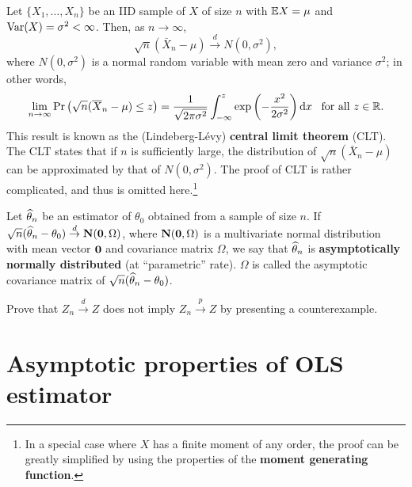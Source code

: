 \documentclass[11pt, A4paper, openany, uplatex]{book}
\begin{document}
Let $\{ X_1,\ldots,X_n \}$ be an IID sample of $X$ of size $n$ with $\mathbb{E} X = \mu$ and $\mathrm{Var}(X) = \sigma^2 < \infty$.
Then, as $n \to \infty$,
\[	
\sqrt{n}(\bar X_n - \mu) \overset{d}{\to} N(0,\sigma^2),
\]
where $N(0, \sigma^2)$ is a normal random variable with mean zero and variance $\sigma^2$; in other words,
\[
\lim_{n \to \infty}\Pr\left( \sqrt{n}(\overline X_n - \mu) \le z \right) = \frac{1}{\sqrt{2 \pi \sigma^2}}\int_{-\infty}^z \exp\left(-\frac{x^2}{2\sigma^2} \right) \mathrm{d}x \;\;\; \text{for all $z\in\mathbb{R}$.}
\]
This result is known as the (Lindeberg-L\'{e}vy) \textbf{central limit theorem} (CLT).
The CLT states that if $n$ is sufficiently large, the distribution of $\sqrt{n}(\bar X_n - \mu)$ can be approximated by that of $N(0,\sigma^2)$.
The proof of CLT is rather complicated, and thus is omitted here.\footnote{
	In a special case where $X$ has a finite moment of any order, the proof can be greatly simplified by using the properties of the \textbf{moment generating function}.
}
\bigskip

Let $\widehat \theta_n$ be an estimator of $\theta_0$ obtained from a sample of size $n$.
If $\sqrt{n}(\widehat \theta_n - \theta_0) \overset{d}{\to} \mathbf{N}(\mathbf{0},\Omega)$, where $\mathbf{N}(\mathbf{0}, \Omega)$ is a multivariate normal distribution with mean vector $\mathbf{0}$ and covariance matrix $\Omega$, we say that $\widehat \theta_n$ is \textbf{asymptotically normally distributed} (at ``parametric'' rate).
$\Omega$ is called the asymptotic covariance matrix of $\sqrt{n}(\widehat \theta_n - \theta_0)$.

\begin{framed}
\begin{exercise}\upshape
	Prove that $Z_n \overset{d}{\to} Z$ does not imply $Z_n \overset{p}{\to} Z$ by presenting a counterexample.
\end{exercise}

\begin{comment}
$X_0 \sim \text{Uniform}[-1,1]$, $X_n \equiv (-1)^n X_0$. 
Then $\Pr(X_n < x) = \Pr(X_0 < x)$, but $X_n$ never converges to $X_0$.
\end{comment}
\end{framed}

\section{Asymptotic properties of OLS estimator}
\end{document}

